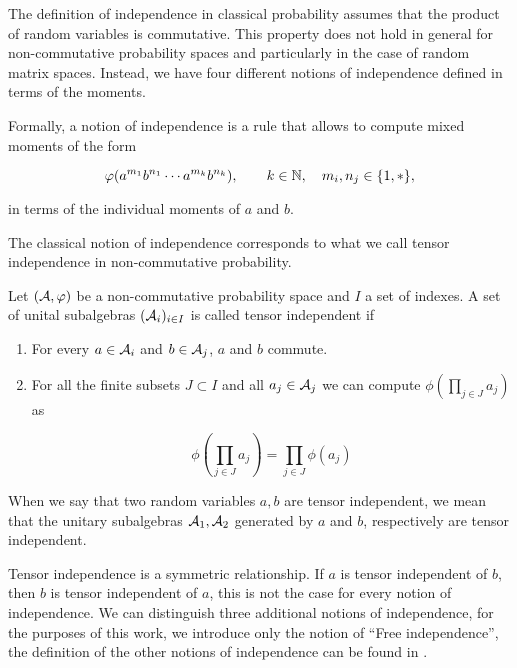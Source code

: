     The definition of independence in classical probability assumes that the product of random variables is commutative. This property does not hold in general for non-commutative probability spaces and particularly in the case of random matrix spaces. Instead, we have four different notions of independence defined in terms of the moments.

    Formally, a notion of independence is a rule that allows to compute mixed moments of the form

    \begin{equation*}
        \varphi(a^{m_1}b^{n_1} \cdots a^{m_{k}}b^{n_k}), \qquad k \in \mathbb N, \quad m_i, n_j \in \{1,*\},
    \end{equation*}

    \noindent in terms of the individual moments of $a$ and $b$.

    The classical notion of independence corresponds to what we call tensor independence in non-commutative probability.

    \begin{definition}
        Let $(\mathcal A, \varphi)$ be a non-commutative probability space and $I$ a set of indexes. A set of unital subalgebras $(\mathcal A_{i})_{i\in I}$ is called tensor independent if

        \begin{enumerate}
            \item For every $a\in \mathcal A_i$ and $b\in \mathcal A_j$, $a$ and $b$ commute.
            \item For all the finite subsets $J\subset I$ and all $a_j \in \mathcal A_j$ we can compute $\phi\left( \prod_{j\in J} a_j \right)$ as
            
            \begin{equation*}
                \phi\left( \prod_{j\in J} a_j \right) = \prod_{j\in J}  \phi\left( a_j \right)
            \end{equation*}
        \end{enumerate}

        When we say that two random variables $a,b$ are tensor independent, we mean that the unitary subalgebras $\mathcal A_1, \mathcal A_2$ generated by $a$ and $b$, respectively are tensor independent.
    \end{definition}

    Tensor independence is a symmetric relationship. If $a$ is tensor independent of $b$, then $b$ is tensor independent of $a$, this is not the case for every notion of independence. We can distinguish three additional notions of independence, for the purposes of this work, we introduce only the notion of ``Free independence'', the definition of the other notions of independence can be found in \cite{anaya2016cumulantes}.

